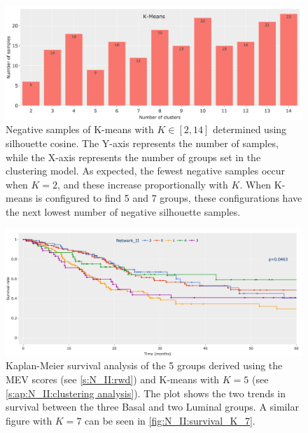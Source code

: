 \begin{figure}[H]    
    \centering
    \includegraphics[width=1.0\textwidth,height=1.0\textheight,keepaspectratio]{Sections/Network_II/resources/reward/cluster_analysis/neg_samples.png}
    \caption[Negative silhouette samples]{Negative samples of K-means with $K \in [2,14]$ determined using silhouette cosine. The Y-axis represents the number of samples, while the X-axis represents the number of groups set in the clustering model. As expected, the fewest negative samples occur when $K=2$, and these increase proportionally with $K$. When K-means is configured to find 5 and 7 groups, these configurations have the next lowest number of negative silhouette samples.}
    \label{fig:ap:neg_samples}
\end{figure}

\begin{figure}[H]    
    \centering
    \includegraphics[width=1.0\textwidth,height=1.0\textheight,keepaspectratio]{Sections/Network_II/resources/reward/cluster_analysis/survival_K_5.png}
    \caption[Kaplan-Meier survival for when K=5 in K-means clustering]{Kaplan-Meier survival analysis of the 5 groups derived using the MEV scores (see \cref{s:N_II:rwd}) and K-means with $K=5$ (see \cref{s:ap:N_II:clustering analysis}). The plot shows the two trends in survival between the three Basal and two Luminal groups. A similar figure with $K=7$ can be seen in \cref{fig:N_II:survival_K_7}.}
    \label{fig:ap:survival_K_5}
\end{figure}

